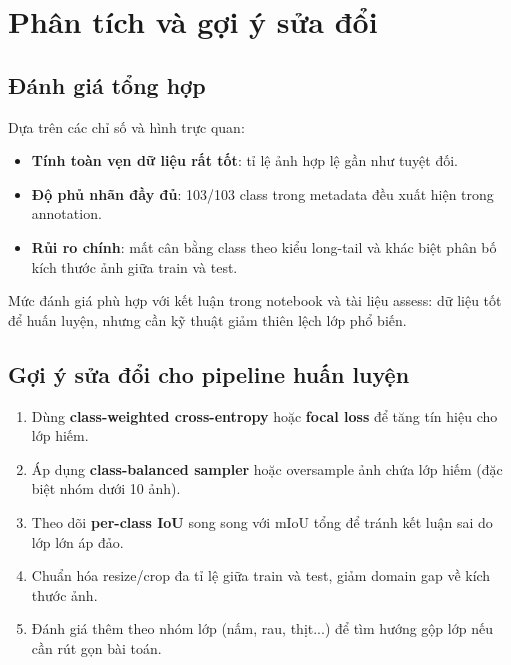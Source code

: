 \section{Phân tích và gợi ý sửa đổi}

\subsection{Đánh giá tổng hợp}
Dựa trên các chỉ số và hình trực quan:
\begin{itemize}[leftmargin=1.5em]
    \item \textbf{Tính toàn vẹn dữ liệu rất tốt}: tỉ lệ ảnh hợp lệ gần như tuyệt đối.
    \item \textbf{Độ phủ nhãn đầy đủ}: 103/103 class trong metadata đều xuất hiện trong annotation.
    \item \textbf{Rủi ro chính}: mất cân bằng class theo kiểu long-tail và khác biệt phân bố kích thước ảnh giữa train và test.
\end{itemize}

Mức đánh giá phù hợp với kết luận trong notebook và tài liệu assess: dữ liệu tốt để huấn luyện, nhưng cần kỹ thuật giảm thiên lệch lớp phổ biến.

\subsection{Gợi ý sửa đổi cho pipeline huấn luyện}
\begin{enumerate}[leftmargin=1.5em]
    \item Dùng \textbf{class-weighted cross-entropy} hoặc \textbf{focal loss} để tăng tín hiệu cho lớp hiếm.
    \item Áp dụng \textbf{class-balanced sampler} hoặc oversample ảnh chứa lớp hiếm (đặc biệt nhóm dưới 10 ảnh).
    \item Theo dõi \textbf{per-class IoU} song song với mIoU tổng để tránh kết luận sai do lớp lớn áp đảo.
    \item Chuẩn hóa resize/crop đa tỉ lệ giữa train và test, giảm domain gap về kích thước ảnh.
    \item Đánh giá thêm theo nhóm lớp (nấm, rau, thịt...) để tìm hướng gộp lớp nếu cần rút gọn bài toán.
\end{enumerate}


